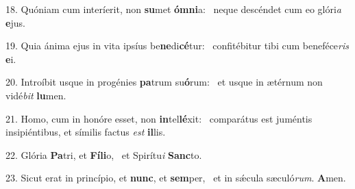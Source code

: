 18. Quóniam cum interíerit, non \textbf{su}met \textbf{óm}\textbf{ni}a: \ast\  neque descéndet cum eo glóri\textit{a} \textbf{e}jus.\

19. Quia ánima ejus in vita ipsíus be\textbf{ne}di\textbf{cé}tur: \ast\  confitébitur tibi cum beneféce\textit{ris} \textbf{e}i.\

20. Introíbit usque in progénies \textbf{pa}trum su\textbf{ó}rum: \ast\  et usque in ætérnum non vidé\textit{bit} \textbf{lu}men.\

21. Homo, cum in honóre esset, non \textbf{in}tel\textbf{lé}xit: \ast\  comparátus est juméntis insipiéntibus, et símilis factus \textit{est} \textbf{il}lis.\

22. Glória \textbf{Pa}tri, et \textbf{Fí}\textbf{li}o, \ast\  et Spirítu\textit{i} \textbf{Sanc}to.\

23. Sicut erat in princípio, et \textbf{nunc}, et \textbf{sem}per, \ast\  et in sǽcula sæculó\textit{rum}. \textbf{A}men.\

